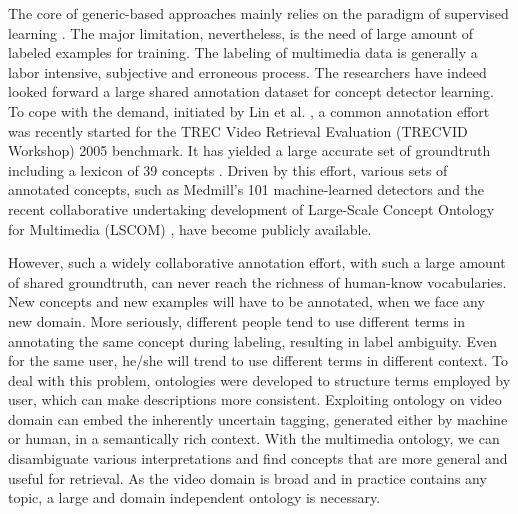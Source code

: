The core of generic-based approaches mainly relies on the paradigm
of supervised learning \cite{CeesG.M.Snoek:ACMMM:2006}. The major
limitation, nevertheless, is the need of large amount of labeled
examples for training. The labeling of multimedia data is generally
a labor intensive, subjective and erroneous process. The researchers
have indeed looked forward a large shared annotation dataset for
concept detector learning. To cope with the demand, initiated by Lin
et al. \cite{C.Y.Lin:TRECVID:2003}, a common annotation effort was
recently started for the TREC Video Retrieval Evaluation (TRECVID
Workshop) 2005 benchmark. It has yielded a large accurate set of
groundtruth including a lexicon of 39 concepts
\cite{M.R.Naphade:2005}. Driven by this effort, various sets of
annotated concepts, such as Medmill's 101 machine-learned detectors
\cite{CeesG.M.Snoek:ACMMM:2006} and the recent collaborative
undertaking development of Large-Scale Concept Ontology for
Multimedia (LSCOM) \cite{Milind.Naphade:IEEEMM:2006}, have become
publicly available.

However, such a widely collaborative annotation effort, with such a
large amount of shared groundtruth, can never reach the richness of
human-know vocabularies. New concepts and new examples will have to
be annotated, when we face any new domain. More seriously, different
people tend to use different terms in annotating the same concept
during labeling, resulting in label ambiguity. Even for the same
user, he/she will trend to use different terms in different context.
To deal with this problem, ontologies
\cite{C.Fellbaum:1998,H.Liu:BTTJ:2004} were developed to structure
terms employed by user, which can make descriptions more consistent.
Exploiting ontology on video domain can embed the inherently
uncertain tagging, generated either by machine or human, in a
semantically rich context. With the multimedia ontology, we can
disambiguate various interpretations and find concepts that are more
general and useful for retrieval. As the video domain is broad and
in practice contains any topic, a large and domain independent
ontology is necessary.

